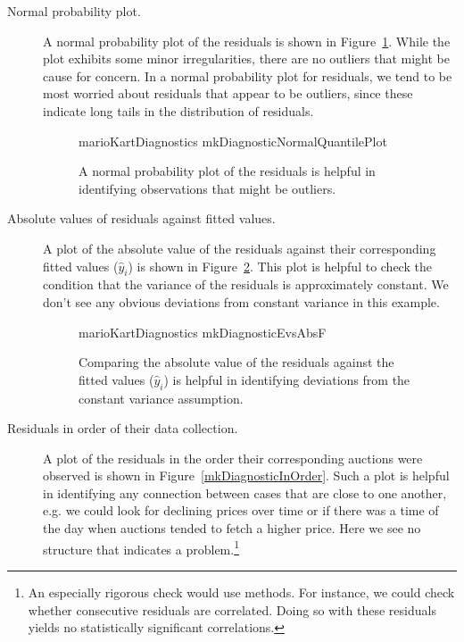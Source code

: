 \begin{description}
\item[Normal probability plot.] A normal probability plot of the residuals is shown in Figure~\ref{mkDiagnosticNormalQuantilePlot}. While the plot exhibits some minor irregularities, there are no outliers that might be cause for concern. In a normal probability plot for residuals, we tend to be most worried about residuals that appear to be outliers, since these indicate long tails in the distribution of residuals.

\begin{figure}[h]
  \centering
      {marioKartDiagnostics}
      {mkDiagnosticNormalQuantilePlot}
  \caption{A normal probability plot of the residuals is helpful in identifying observations that might be outliers.}
  \label{mkDiagnosticNormalQuantilePlot}
\end{figure}

\item[Absolute values of residuals against fitted values.] A plot of the absolute value of the residuals against their corresponding fitted values ($\hat{y}_i$) is shown in Figure~\ref{mkDiagnosticEvsAbsF}. This plot is helpful to check the condition that the variance of the residuals is approximately constant. We don't see any obvious deviations from constant variance in this example.

\begin{figure}
  \centering
      {marioKartDiagnostics}
      {mkDiagnosticEvsAbsF}
  \caption{Comparing the absolute value of the residuals against the fitted values ($\hat{y}_i$) is helpful in identifying deviations from the constant variance assumption.}
  \label{mkDiagnosticEvsAbsF}
\end{figure}

\item[Residuals in order of their data collection.] A plot of the residuals in the order their corresponding auctions were observed is shown in Figure~\ref{mkDiagnosticInOrder}. Such a plot is helpful in identifying any connection between cases that are close to one another, e.g. we could look for declining prices over time or if there was a time of the day when auctions tended to fetch a higher price. Here we see no structure that indicates a problem.\footnote{An especially rigorous check would use  methods. For instance, we could check whether consecutive residuals are correlated. Doing so with these residuals yields no statistically significant correlations.}


\end{description}
